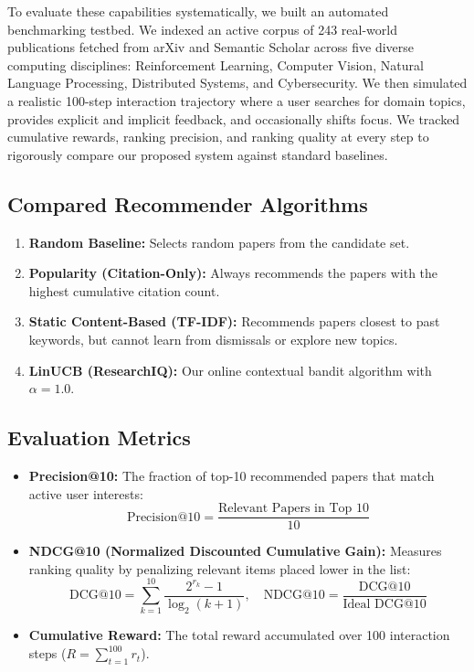 \documentclass[11pt,a4paper]{article}
\begin{document}
To evaluate these capabilities systematically, we built an automated benchmarking testbed. We indexed an active corpus of 243 real-world publications fetched from arXiv and Semantic Scholar across five diverse computing disciplines: Reinforcement Learning, Computer Vision, Natural Language Processing, Distributed Systems, and Cybersecurity. We then simulated a realistic 100-step interaction trajectory where a user searches for domain topics, provides explicit and implicit feedback, and occasionally shifts focus. We tracked cumulative rewards, ranking precision, and ranking quality at every step to rigorously compare our proposed system against standard baselines.

\subsection{Compared Recommender Algorithms}
\begin{enumerate}[leftmargin=1.5em]
    \item \textbf{Random Baseline:} Selects random papers from the candidate set.
    \item \textbf{Popularity (Citation-Only):} Always recommends the papers with the highest cumulative citation count.
    \item \textbf{Static Content-Based (TF-IDF):} Recommends papers closest to past keywords, but cannot learn from dismissals or explore new topics.
    \item \textbf{LinUCB (ResearchIQ):} Our online contextual bandit algorithm with $\alpha = 1.0$.
\end{enumerate}

\subsection{Evaluation Metrics}
\begin{itemize}[leftmargin=1.5em]
    \item \textbf{Precision@10:} The fraction of top-10 recommended papers that match active user interests:
    \begin{equation}
    \text{Precision@10} = \frac{\text{Relevant Papers in Top 10}}{10}
    \end{equation}
    \item \textbf{NDCG@10 (Normalized Discounted Cumulative Gain):} Measures ranking quality by penalizing relevant items placed lower in the list:
    \begin{equation}
    \text{DCG@10} = \sum_{k=1}^{10} \frac{2^{r_k} - 1}{\log_2(k + 1)}, \quad \text{NDCG@10} = \frac{\text{DCG@10}}{\text{Ideal DCG@10}}
    \end{equation}
    \item \textbf{Cumulative Reward:} The total reward accumulated over 100 interaction steps ($R = \sum_{t=1}^{100} r_t$).
\end{itemize}
\end{document}
